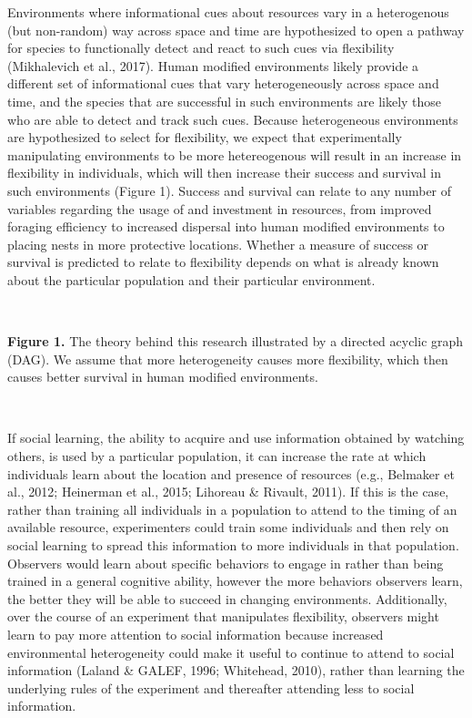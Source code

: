 \documentclass[
]{article}
\begin{document}
Environments where informational cues about resources vary in a
heterogenous (but non-random) way across space and time are hypothesized
to open a pathway for species to functionally detect and react to such
cues via flexibility (Mikhalevich et al., 2017). Human modified
environments likely provide a different set of informational cues that
vary heterogeneously across space and time, and the species that are
successful in such environments are likely those who are able to detect
and track such cues. Because heterogeneous environments are hypothesized
to select for flexibility, we expect that experimentally manipulating
environments to be more hetereogenous will result in an increase in
flexibility in individuals, which will then increase their success and
survival in such environments (Figure 1). Success and survival can
relate to any number of variables regarding the usage of and investment
in resources, from improved foraging efficiency to increased dispersal
into human modified environments to placing nests in more protective
locations. Whether a measure of success or survival is predicted to
relate to flexibility depends on what is already known about the
particular population and their particular environment.

~

\textbf{Figure 1.} The theory behind this research illustrated by a
directed acyclic graph (DAG). We assume that more heterogeneity causes
more flexibility, which then causes better survival in human modified
environments.

~

If social learning, the ability to acquire and use information obtained
by watching others, is used by a particular population, it can increase
the rate at which individuals learn about the location and presence of
resources (e.g., Belmaker et al., 2012; Heinerman et al., 2015; Lihoreau
\& Rivault, 2011). If this is the case, rather than training all
individuals in a population to attend to the timing of an available
resource, experimenters could train some individuals and then rely on
social learning to spread this information to more individuals in that
population. Observers would learn about specific behaviors to engage in
rather than being trained in a general cognitive ability, however the
more behaviors observers learn, the better they will be able to succeed
in changing environments. Additionally, over the course of an experiment
that manipulates flexibility, observers might learn to pay more
attention to social information because increased environmental
heterogeneity could make it useful to continue to attend to social
information (Laland \& GALEF, 1996; Whitehead, 2010), rather than
learning the underlying rules of the experiment and thereafter attending
less to social information.
\end{document}
